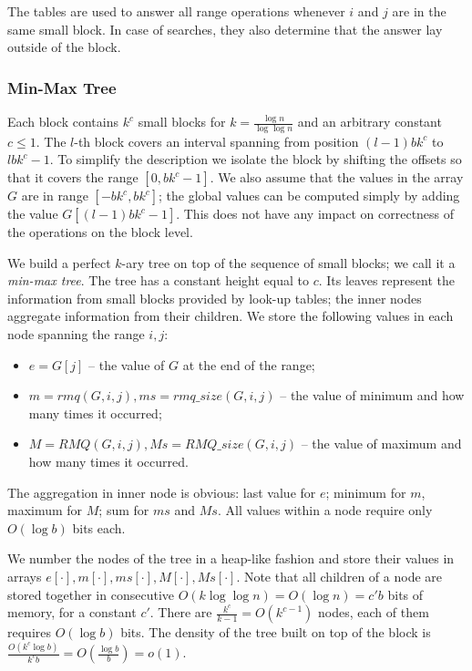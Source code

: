 The tables are used to answer all range operations whenever $i$ and $j$ are in the same small block.
In case of searches, they also determine that the answer lay outside of the block.

\subsubsection{Min-Max Tree}

Each block contains $k^c$ small blocks for $k = \frac{\log n}{\log \log n}$ and an arbitrary constant $c \le 1$.
The $l$-th block covers an interval spanning from position $(l-1) b k^c$ to $l b k^c - 1$.
To simplify the description we isolate the block by shifting the offsets so that it covers the range $[0, b k^c - 1]$.
We also assume that the values in the array $G$ are in range $[-b k^c, b k^c]$; the global values can be computed simply by adding the value $G[(l-1) b k^c - 1]$.
This does not have any impact on correctness of the operations on the block level.

We build a perfect $k$-ary tree on top of the sequence of small blocks; we call it a \emph{min-max tree}.
The tree has a constant height equal to $c$.
Its leaves represent the information from small blocks provided by look-up tables; the inner nodes aggregate information from their children.
We store the following values in each node spanning the range $i, j$:
\begin{itemize}
	\item $e = G[j]$ -- the value of $G$ at the end of the range;
	\item $m = rmq(G, i, j), ms = rmq\_size(G, i, j)$ -- the value of minimum and how many times it occurred;
	\item $M = RMQ(G, i, j), Ms = RMQ\_size(G, i, j)$ -- the value of maximum and how many times it occurred.
\end{itemize}

The aggregation in inner node is obvious: last value for $e$; minimum for $m$, maximum for $M$; sum for $ms$ and $Ms$.
All values within a node require only $O(\log b)$ bits each.

We number the nodes of the tree in a heap-like fashion and store their values in arrays $e[\cdot], m[\cdot], ms[\cdot], M[\cdot], Ms[\cdot]$.
Note that all children of a node are stored together in consecutive $O(k \log \log n) = O(\log n) = c' b$ bits of memory, for a constant $c'$.
There are $\frac{k^c}{k-1} = O(k^{c-1})$ nodes, each of them requires $O(\log b)$ bits.
The density of the tree built on top of the block is $\frac{O(k^c \log b)}{k^c b} = O(\frac{\log b}{b}) = o(1)$.


